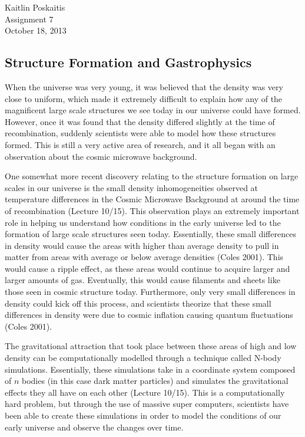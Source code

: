 \documentclass[12pt]{article}
\begin{document}
\noindent Kaitlin Poskaitis\\
Assignment 7\\
October 18, 2013
\begin{center}
    \section*{\bf Structure Formation and Gastrophysics}
\end{center}

When the universe was very young, it was believed that the density was very
close to uniform, which made it extremely difficult to explain how any of the
magnificent large scale structures we see today in our universe could have
formed.  However, once it was found that the density differed slightly at the
time of recombination, suddenly scientists were able to model how these
structures formed.  This is still a very active area of research, and it all
began with an observation about the cosmic microwave background.

One somewhat more recent discovery relating to the structure formation on large
scales in our universe is the small density inhomogeneities observed at
temperature differences in the Cosmic Microwave Background at around the time of
recombination (Lecture 10/15).  This observation plays an extremely important
role in helping us
understand how conditions in the early universe led to the formation of large
scale structures seen today.  Essentially, these small differences in density
would cause the areas with higher than average density to pull in matter from
areas with average or below average densities (Coles 2001).  This would cause
a ripple
effect, as these areas would continue to acquire larger and larger amounts of
gas.  Eventually, this would cause filaments and sheets like those seen in
cosmic structure today.  Furthermore, only very small differences in density
could kick off this process, and scientists theorize that these small
differences in density were due to cosmic inflation causing quantum
fluctuations (Coles 2001).

The gravitational attraction that took place between these areas of high and low
density can be computationally modelled through a technique called N-body
simulations.  Essentially, these simulations take in a coordinate system
composed of $n$ bodies (in this case dark matter particles) and simulates the
gravitational effects they all have on each other (Lecture 10/15).  This is a
computationally
hard problem, but through the use of massive super computers, scientists have
been able to create these simulations in order to model the conditions of our
early universe and observe the changes over time.
\end{document}
